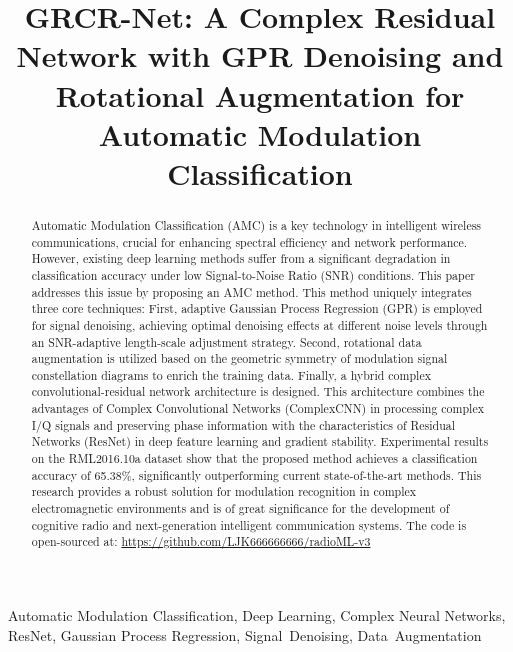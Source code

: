 \documentclass[conference]{IEEEtran}
\begin{document}
\sloppy

\title{GRCR-Net: A Complex Residual Network with GPR Denoising and Rotational Augmentation for Automatic Modulation Classification}

\author{
}

\maketitle

\begin{abstract}
Automatic Modulation Classification (AMC) is a key technology in intelligent wireless communications, crucial for enhancing spectral efficiency and network performance.
However, existing deep learning methods suffer from a significant degradation in classification accuracy under low Signal-to-Noise Ratio (SNR) conditions.
This paper addresses this issue by proposing an AMC method.
This method uniquely integrates three core techniques:
First, adaptive Gaussian Process Regression (GPR) is employed for signal denoising, achieving optimal denoising effects at different noise levels through an SNR-adaptive length-scale adjustment strategy.
Second, rotational data augmentation is utilized based on the geometric symmetry of modulation signal constellation diagrams to enrich the training data.
Finally, a hybrid complex convolutional-residual network architecture is designed.
This architecture combines the advantages of Complex Convolutional Networks (ComplexCNN) in processing complex I/Q signals and preserving phase information with the characteristics of Residual Networks (ResNet) in deep feature learning and gradient stability.
Experimental results on the RML2016.10a dataset show that the proposed method achieves a classification accuracy of 65.38\%, significantly outperforming current state-of-the-art methods.
This research provides a robust solution for modulation recognition in complex electromagnetic environments and is of great significance for the development of cognitive radio and next-generation intelligent communication systems.
The code is open-sourced at: \url{https://github.com/LJK666666666/radioML-v3}
\end{abstract}

\begin{IEEEkeywords}
Automatic Modulation Classification, Deep Learning, Complex Neural Networks, ResNet, Gaussian Process Regression, Signal~Denoising, Data~Augmentation
\end{IEEEkeywords}
\end{document}
